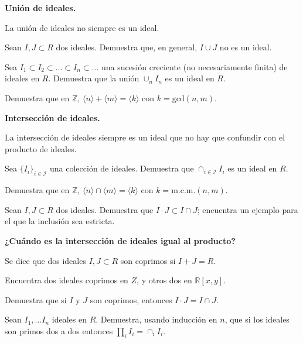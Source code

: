 \begin{problem}
{\bfseries Unión de ideales.}

La unión de ideales no siempre es un ideal.

\ppart Sean $I,J\subset R$ dos ideales. Demuestra que, en general, $I\cup J$ no es un ideal.

\ppart  Sea $I_1\subset I_2\subset \ldots \subset I_n \subset \ldots$  una sucesión creciente (no necesariamente finita) de ideales en $R$.
Demuestra que la unión $\cup_{n}I_n$ es un ideal en $R$.

\ppart Demuestra que en ${\mathbb Z}$, $\langle n\rangle +\langle m\rangle=\langle k\rangle$ con $k=\text{gcd}(n,m)$.
\solution
\end{problem}

\begin{problem}
{\bfseries Intersección de ideales.}

La intersección de ideales siempre es un ideal que no hay que confundir con el producto de ideales.

\ppart Sea $\{I_i\}_{i\in {\mathcal I}}$ una colección de ideales.  Demuestra que $\cap_{i\in {\mathcal I}} I_i$ es un ideal en $R$.

\ppart  Demuestra que en ${\mathbb Z}$, $\langle n\rangle \cap \langle m\rangle=\langle k\rangle$ con $k=\text{m.c.m.}(n,m)$.

\ppart  Sean $I, J\subset R$ dos ideales. Demuestra que $I\cdot J\subset I\cap J$; encuentra un ejemplo para el que la inclusión sea estricta.
\solution
\end{problem}

\begin{problem}
{\bfseries ¿Cuándo es la intersección de ideales igual al producto?}

Se dice que dos ideales $I, J\subset R$ son coprimos si $I+J=R$.

\ppart Encuentra dos ideales coprimos en
$Z$, y otros dos en ${\mathbb R}[x,y]$.

\ppart Demuestra que si $I$ y $J$ son coprimos, entonces  $I\cdot J=I\cap J$.

\ppart Sean $I_1,\ldots I_n$ ideales en $R$. Demuestra, usando inducción en $n$, que si los ideales son primos dos a dos entonces $\prod_iI_i=\cap_iI_i$.

\solution
\end{problem}


